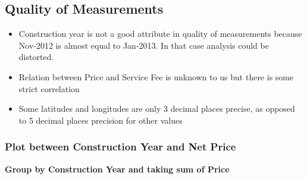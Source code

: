 \documentclass[11pt]{article}
\begin{document}
    \hypertarget{quality-of-measurements}{%
\subsection{Quality of Measurements}\label{quality-of-measurements}}

\begin{itemize}
\item
  Construction year is not a good attribute in quality of measurements
  because Nov-2012 is almost equal to Jan-2013. In that case analysis
  could be distorted.
\item
  Relation between Price and Service Fee is unknown to us but there is
  some strict correlation
\item
  Some latitudes and longitudes are only 3 decimal places precise, as
  opposed to 5 decimal places precision for other values
\end{itemize}

\hypertarget{plot-between-construction-year-and-net-price}{%
\subsubsection{Plot between Construction Year and Net
Price}\label{plot-between-construction-year-and-net-price}}

\textbf{Group by Construction Year and taking sum of Price}
\end{document}
